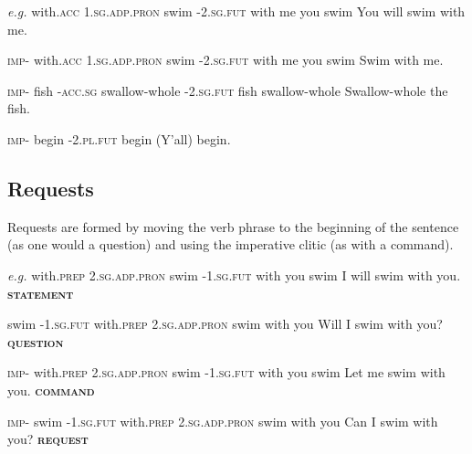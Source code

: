 \documentclass[11pt]{report}
\newcommand{\R}{{\*r}}
\begin{document}
\textit{e.g.}
{with.\textsc{acc} \textsc{1.sg.adp.pron} swim -\textsc{2.sg.fut}}
{with me you swim {}}
{You will swim with me.}

{\textsc{imp}- with.\textsc{acc} \textsc{1.sg.adp.pron} swim -\textsc{2.sg.fut}}
{{} with me you swim {}}
{Swim with me.}

\trigloss[preamble={\textipa{mES:eS:A\R{} Hamini}}]
{\textipa{mE}- \textipa{S:eS:} -\textipa{A\R} \textipa{Ham} -\textipa{ini}}
{\textsc{imp}- fish -\textsc{acc.sg} swallow-whole -\textsc{2.sg.fut}}
{{} fish {} swallow-whole {}}
{Swallow-whole the fish.}

{\textsc{imp}- begin -\textsc{2.pl.fut}}
{{} begin {}}
{(Y'all) begin.}

\subsection{Requests}
Requests are formed by moving the verb phrase to the beginning of the sentence (as one would a question) and using the imperative clitic \textit{} (as with a command).

\textit{e.g.}
{with.\textsc{prep} \textsc{2.sg.adp.pron} swim -\textsc{1.sg.fut}}
{with you swim {}}
{I will swim with you. \textbf{\textsc{statement}}}

{swim -\textsc{1.sg.fut} with.\textsc{prep} \textsc{2.sg.adp.pron}}
{swim {} with you}
{Will I swim with you? \textbf{\textsc{question}}}

{\textsc{imp}- with.\textsc{prep} \textsc{2.sg.adp.pron} swim -\textsc{1.sg.fut}}
{{} with you swim {}}
{Let me swim with you. \textbf{\textsc{command}}}

{\textsc{imp}- swim -\textsc{1.sg.fut} with.\textsc{prep} \textsc{2.sg.adp.pron}}
{{} swim {} with you}
{Can I swim with you? \textbf{\textsc{request}} }
\end{document}
